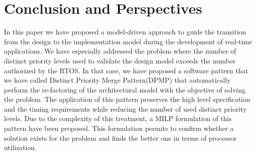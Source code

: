 \documentclass[runningheads,a4paper]{llncs}
\begin{document}
\section{Conclusion and Perspectives}
In this paper we have proposed a model-driven approach to guide the transition from the design to the implementation model during the development of real-time applications. We have especially addressed the problem where the number of distinct priority levels used to validate the design model exceeds the number authorized by the RTOS. In that case, we have proposed a software pattern that we have called Distinct Priority Merge Pattern(DPMP) that automatically perform the re-factoring of the architectural model with the objective of solving the problem. The application of this pattern preserves the high level specification and the timing requirements while reducing the number of used distinct priority levels. Due to the complexity of this treatment, a MILP formulation of this pattern have been proposed. This formulation permits to confirm whether a solution exists for the problem and finds the better one in terms of processor utilization. 
\end{document}
